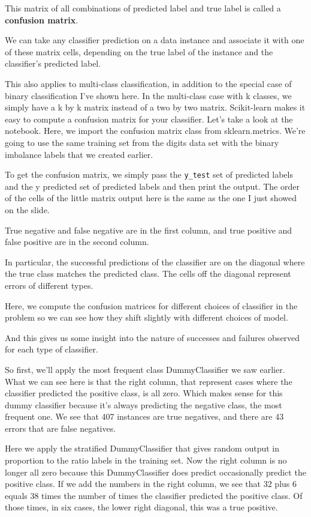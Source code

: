 \begin{multicols}{2}
This matrix of all combinations of predicted label and true label is called a \textbf{confusion matrix}. 

We can take any classifier prediction on a data instance and associate it with one of these matrix cells, depending on the true label of the instance and the classifier's predicted label. 

This also applies to multi-class classification, in addition to the special case of binary classification I've shown here. In the multi-class case with k classes, we simply have a k by k matrix instead of a two by two matrix. Scikit-learn makes it easy to compute a confusion matrix for your classifier. Let's take a look at the notebook. Here, we import the confusion matrix class from sklearn.metrics. We're going to use the same training set from the digits data set with the binary imbalance labels that we created earlier. 

To get the confusion matrix, we simply pass the \texttt{y_test} set of predicted labels and the y predicted set of predicted labels and then print the output. The order of the cells of the little matrix output here is the same as the one I just showed on the slide. 

True negative and false negative are in the first column, and true positive and false positive are in the second column. 

In particular, the successful predictions of the classifier are on the diagonal where the true class matches the predicted class. The cells off the diagonal represent errors of different types. 

Here, we compute the confusion matrices for different choices of classifier in the problem so we can see how they shift slightly with different choices of model. 

And this gives us some insight into the nature of successes and failures observed for each type of classifier. 

So first, we'll apply the most frequent class DummyClassifier we saw earlier. What we can see here is that the right column, that represent cases where the classifier predicted the positive class, is all zero. Which makes sense for this dummy classifier because it's always predicting the negative class, the most frequent one. We see that 407 instances are true negatives, and there are 43 errors that are false negatives. 

Here we apply the stratified DummyClassifier that gives random output in proportion to the ratio labels in the training set. Now the right column is no longer all zero because this DummyClassifier does predict occasionally predict the positive class. If we add the numbers in the right column, we see that 32 plus 6 equals 38 times the number of times the classifier predicted the positive class. Of those times, in six cases, the lower right diagonal, this was a true positive. 


\end{multicols}

